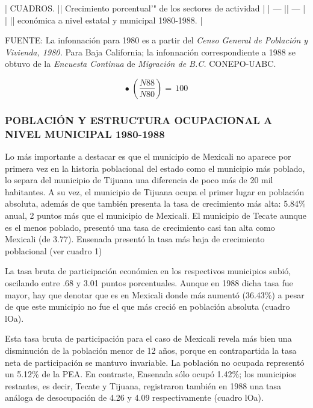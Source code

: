 \documentclass{article}
\begin{document}
| CUADROS. || Crecimiento porcentual'" de los sectores de actividad |
| ---      || ---                                                   |
|          || económica a nivel estatal y municipal 1980-1988.      |

FUENTE: La infonnación para 1980 es a partir del \textit{Censo General de Población y Vivienda, 1980.} Para Baja California; la infonnación correspondiente a 1988 se obtuvo de la \textit{Encuesta Continua} de \textit{Migración de B.C.} CONEPO-UABC.

$$\bullet\;\left({\frac{N88}{N80}}\right)=\,100$$

\subsubsection{POBLACIÓN Y ESTRUCTURA OCUPACIONAL A NIVEL MUNICIPAL 1980-1988}

Lo más importante a destacar es que el municipio de Mexicali no aparece por primera vez en la historia poblacional del estado como el municipio más poblado, lo separa del municipio de Tijuana una diferencia de poco más de 20 mil habitantes. A su vez, el municipio de Tijuana ocupa el primer lugar en población absoluta, además de que también presenta la tasa de crecimiento más alta: 5.84\% anual, 2 puntos más que el municipio de Mexicali. El municipio de Tecate aunque es el menos poblado, presentó una tasa de crecimiento casi tan alta como Mexicali (de 3.77). Ensenada presentó la tasa más baja de crecimiento poblacional (ver cuadro 1)

La tasa bruta de participación económica en los respectivos municipios subió, oscilando entre .68 y 3.01 puntos porcentuales. Aunque en 1988 dicha tasa fue mayor, hay que denotar que es en Mexicali donde más aumentó (36.43\%) a pesar de que este municipio no fue el que más creció en población absoluta (cuadro lOa).

Esta tasa bruta de participación para el caso de Mexicali revela más bien una disminución de la población menor de 12 años, porque en contrapartida la tasa neta de participación se mantuvo invariable. La población no ocupada representó un 5.12\% de la PEA. En contraste, Ensenada sólo ocupó 1.42\%; los municipios restantes, es decir, Tecate y Tijuana, registraron también en 1988 una tasa análoga de desocupación de 4.26 y 4.09 respectivamente (cuadro lOa).
\end{document}
